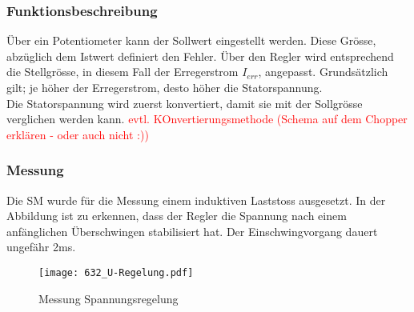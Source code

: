 \begin{flushleft}
\subsubsection{Funktionsbeschreibung}
\vspace{0.3cm}
Über ein Potentiometer kann der Sollwert eingestellt werden. Diese Grösse, abzüglich dem Istwert definiert den Fehler. Über den Regler wird entsprechend die Stellgrösse, in diesem Fall der Erregerstrom $I_{err}$, angepasst. Grundsätzlich gilt; je höher der Erregerstrom, desto höher die Statorspannung. \\
Die Statorspannung wird zuerst konvertiert, damit sie mit der Sollgrösse verglichen werden kann.
\textcolor{red}{evtl. KOnvertierungsmethode (Schema auf dem Chopper erklären - oder auch nicht :))}

\newpage


\subsubsection{Messung}
Die SM wurde für die Messung einem induktiven Laststoss ausgesetzt. In der Abbildung ist zu erkennen, dass der Regler die Spannung nach einem anfänglichen Überschwingen stabilisiert hat. Der Einschwingvorgang dauert ungefähr 2ms.\\

\vspace{0.5cm}



\begin{figure}[H]
    \centering
        \texttt{[image: 632\_U-Regelung.pdf]}
    \caption{Messung Spannungsregelung}
    \label{fig:abb1}
\end{figure}











\end{flushleft}
